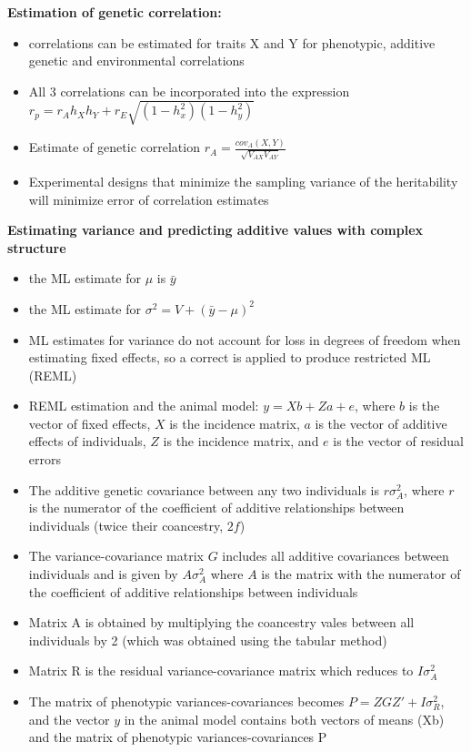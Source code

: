 \documentclass[12pt]{amsart}
\begin{document}
{\large \bf Estimation of genetic correlation:}
\begin{itemize}
\item correlations can be estimated for traits X and Y for phenotypic, additive genetic and environmental correlations
\item All 3 correlations can be incorporated into the expression $r_p = r_Ah_Xh_Y + r_E\sqrt{(1-h^2_x)(1-h^2_y)}$
\item Estimate of genetic correlation $r_A = \frac{cov_A(X,Y)}{\sqrt{V_{AX}V_{AY}}}$
\item Experimental designs that minimize the sampling variance of the heritability will minimize error of correlation estimates 
\end{itemize}
{\large \bf Estimating variance and predicting additive values with complex structure}
\begin{itemize}
\item the ML estimate for $\mu$ is $\bar{y}$
\item the ML estimate for $\sigma^2 = V + (\bar{y} - \mu)^2$
\item ML estimates for variance do not account for loss in degrees of freedom when estimating fixed effects, so a correct is applied to produce restricted ML (REML)
\item REML estimation and the animal model: $y = Xb + Za + e$, where $b$ is the vector of fixed effects, $X$ is the incidence matrix, $a$ is the vector of additive effects of individuals, $Z$ is the incidence matrix, and $e$ is the vector of residual errors
\item The additive genetic covariance between any two individuals is $r\sigma^2_A$, where $r$ is the numerator of the coefficient of additive relationships between individuals (twice their coancestry, $2f$)
\item The variance-covariance matrix $G$ includes all additive covariances between individuals and is given by $A\sigma^2_A$ where $A$ is the matrix with the numerator of the coefficient of additive relationships between individuals
\item Matrix A is obtained by multiplying the coancestry vales between all individuals by 2 (which was obtained using the tabular method)
\item Matrix R is the residual variance-covariance matrix which reduces to $I\sigma^2_A$
\item The matrix of phenotypic variances-covariances becomes $P = ZGZ' + I\sigma^2_R$, and the vector $y$ in the animal model contains both vectors of means (Xb) and the matrix of phenotypic variances-covariances P

\end{itemize}
\end{document}
